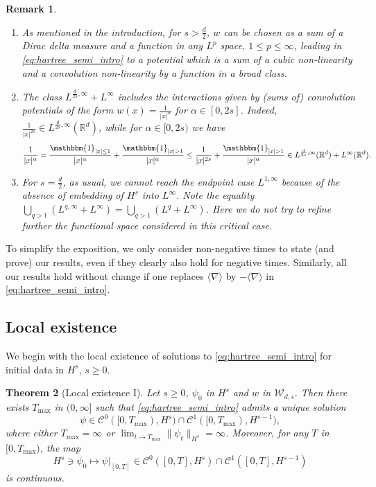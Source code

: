 \documentclass[12pt]{article}
\newcommand{\R}{\mathbb{R}}
\theoremstyle{plain}
\newtheorem{theo}{Theorem}[section]
\newtheorem{rem}[theo]{Remark}
\newcommand{\setW}{{\mathcal{W}_{d,s}}}
\begin{document}
\begin{rem}$ $
\begin{enumerate}
    \item As mentioned in the introduction, for $s>\frac{d}2$, $w$ can be chosen as a sum of a Dirac delta measure and a function in any $L^p$ space, $1\le p\le\infty$, leading in \eqref{eq:hartree_semi_intro} to a potential which is a sum of a cubic non-linearity and a convolution non-linearity by a function in a broad class.
	\item The class $L^{\frac{d}{2s}, \infty} + L^\infty$ includes the interactions given by (sums of) convolution potentials of the form $w(x) = \frac{1}{|x|^\alpha}$ for $\alpha \in [0, 2s]$. Indeed, $\frac{1}{|x|^{2s}} \in L^{\frac{d}{2s}, \infty}(\R^d)$, while for $\alpha \in [0,2s)$ we have 
	\begin{equation*}
		\frac{1}{|x|^\alpha} = \frac{\mathbbm{1}_{|x|\leq 1}}{|x|^\alpha}  +  \frac{\mathbbm{1}_{|x|> 1}}{|x|^\alpha} \leq \frac{1}{|x|^{2s}} + \frac{\mathbbm{1}_{|x|> 1}}{|x|^\alpha}  \in L^{\frac{d}{2s}, \infty}(\R^d) + L^\infty(\R^d). 
	\end{equation*}
	\item For $s=\frac{d}{2}$, as usual, we cannot reach the endpoint case $L^{1,\infty}$ because of the absence of embedding of $H^s$ into $L^\infty$. Note the equality $\bigcup_{q>1}(L^{q,\infty}+L^\infty)=\bigcup_{q>1}(L^{q}+L^\infty)$. Here we do not try to refine further the functional space considered in this critical case.
\end{enumerate}
\end{rem}

To simplify the exposition, we only consider non-negative times to state (and prove) our results, even if they clearly also hold for negative times. Similarly, all our results hold without change if one replaces $\langle\nabla\rangle$ by $-\langle\nabla\rangle$ in \eqref{eq:hartree_semi_intro}.

\subsection{Local existence}

We begin with the local existence of solutions to \eqref{eq:hartree_semi_intro} for initial data in $H^s$, $s\ge0$. 

\begin{theo}[Local existence I]\label{th:local-long-range-intro}
	 Let $s\ge 0$, $\psi_0$ in $H^{s}$ and $w$ in $\setW$. Then there exists $T_{\max}$ in $(0,\infty]$ such that  \eqref{eq:hartree_semi_intro} admits a unique solution 
	\begin{equation*}
		\psi \in \mathcal{C}^0([0, T_{\max}), H^{s}) \cap \mathcal{C}^1 ([0, T_{\max}), H^{s-1}),
	\end{equation*}
	where either $T_{\max}=\infty$ or $\lim_{t\to T_{\max}} \|\psi_t\|_{H^s} =\infty$. Moreover, for any $T$ in $[0, T_{\max})$, the map
	\begin{equation*}
	    H^s\ni\psi_0\mapsto\psi|_{[0,T]}\in\mathcal{C}^0([0,T],H^s)\cap \mathcal{C}^1 ([0, T], H^{s-1})
	\end{equation*}
	is continuous.
\end{theo}
\end{document}
